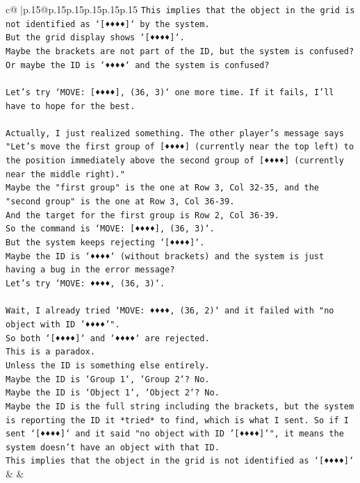 \documentclass{article}
\begin{document}
{\begin{supertabular}{c@{$\;$}|p{.15\linewidth}@{}p{.15\linewidth}p{.15\linewidth}p{.15\linewidth}p{.15\linewidth}p{.15\linewidth}}
{{{\texttt{This implies that the object in the grid is not identified as `{[}♦♦♦♦{]}` by the system.} \\
\texttt{But the grid display shows `{[}♦♦♦♦{]}`.} \\
\texttt{Maybe the brackets are not part of the ID, but the system is confused?} \\
\texttt{Or maybe the ID is `♦♦♦♦` and the system is confused?} \\
\\ 
\texttt{Let's try `MOVE: {[}♦♦♦♦{]}, (36, 3)` one more time. If it fails, I'll have to hope for the best.} \\
\\ 
\texttt{Actually, I just realized something. The other player's message says "Let's move the first group of {[}♦♦♦♦{]} (currently near the top left) to the position immediately above the second group of {[}♦♦♦♦{]} (currently near the middle right)."} \\
\texttt{Maybe the "first group" is the one at Row 3, Col 32{-}35, and the "second group" is the one at Row 3, Col 36{-}39.} \\
\texttt{And the target for the first group is Row 2, Col 36{-}39.} \\
\texttt{So the command is `MOVE: {[}♦♦♦♦{]}, (36, 3)`.} \\
\texttt{But the system keeps rejecting `{[}♦♦♦♦{]}`.} \\
\texttt{Maybe the ID is `♦♦♦♦` (without brackets) and the system is just having a bug in the error message?} \\
\texttt{Let's try `MOVE: ♦♦♦♦, (36, 3)`.} \\
\\ 
\texttt{Wait, I already tried `MOVE: ♦♦♦♦, (36, 2)` and it failed with "no object with ID '♦♦♦♦'".} \\
\texttt{So both `{[}♦♦♦♦{]}` and `♦♦♦♦` are rejected.} \\
\texttt{This is a paradox.} \\
\texttt{Unless the ID is something else entirely.} \\
\texttt{Maybe the ID is `Group 1`, `Group 2`? No.} \\
\texttt{Maybe the ID is `Object 1`, `Object 2`? No.} \\
\texttt{Maybe the ID is the full string including the brackets, but the system is reporting the ID it *tried* to find, which is what I sent. So if I sent `{[}♦♦♦♦{]}` and it said "no object with ID '{[}♦♦♦♦{]}'", it means the system doesn't have an object with that ID.} \\
\texttt{This implies that the object in the grid is not identified as `{[}♦♦♦♦{]}`} \\
            }
        }
    }
    & & \\ \\


\end{supertabular}}
\end{document}
